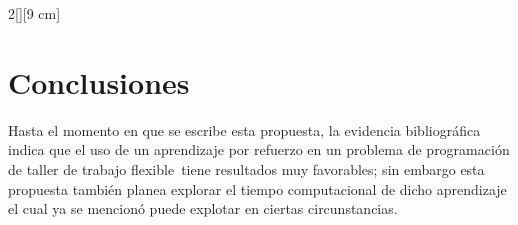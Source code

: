 \documentclass[letterpaper, 10 pt]{article}
\newcommand{\fjsp}{problema de programación de taller de trabajo flexible}
\begin{document}
\begin{multicols}{2}[][9 cm]
\section{Conclusiones}
Hasta el momento en que se escribe esta propuesta, la evidencia bibliográfica indica que el uso de un aprendizaje por refuerzo en un \fjsp \, tiene resultados muy favorables; sin embargo esta propuesta también planea explorar el tiempo computacional de dicho aprendizaje el cual ya se mencionó puede explotar en ciertas circunstancias.

\end{multicols}



\newpage

%
%


\end{document}
